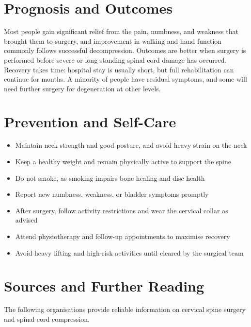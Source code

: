 \section*{Prognosis and Outcomes}
Most people gain significant relief from the pain, numbness, and weakness that brought them to surgery, and improvement in walking and hand function commonly follows successful decompression. Outcomes are better when surgery is performed before severe or long-standing spinal cord damage has occurred. Recovery takes time: hospital stay is usually short, but full rehabilitation can continue for months. A minority of people have residual symptoms, and some will need further surgery for degeneration at other levels.

\section*{Prevention and Self-Care}
\begin{itemize}
    \item Maintain neck strength and good posture, and avoid heavy strain on the neck
    \item Keep a healthy weight and remain physically active to support the spine
    \item Do not smoke, as smoking impairs bone healing and disc health
    \item Report new numbness, weakness, or bladder symptoms promptly
    \item After surgery, follow activity restrictions and wear the cervical collar as advised
    \item Attend physiotherapy and follow-up appointments to maximise recovery
    \item Avoid heavy lifting and high-risk activities until cleared by the surgical team
\end{itemize}

\section*{Sources and Further Reading}
The following organisations provide reliable information on cervical spine surgery and spinal cord compression.


